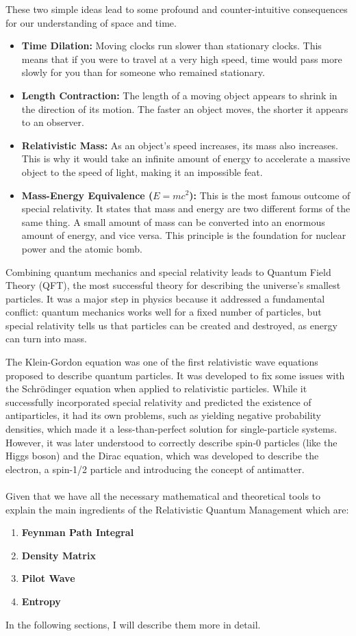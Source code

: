 \documentclass{article}
\begin{document}
These two simple ideas lead to some profound and counter-intuitive consequences for our understanding of space and time.

\begin{itemize}
    \item \textbf{Time Dilation:} Moving clocks run slower than stationary clocks. This means that if you were to travel at a very high speed, time would pass more slowly for you than for someone who remained stationary.
    \item \textbf{Length Contraction:} The length of a moving object appears to shrink in the direction of its motion. The faster an object moves, the shorter it appears to an observer.
    \item \textbf{Relativistic Mass:} As an object's speed increases, its mass also increases. This is why it would take an infinite amount of energy to accelerate a massive object to the speed of light, making it an impossible feat.
    \item \textbf{Mass-Energy Equivalence ($E=mc^2$):} This is the most famous outcome of special relativity. It states that mass and energy are two different forms of the same thing. A small amount of mass can be converted into an enormous amount of energy, and vice versa. This principle is the foundation for nuclear power and the atomic bomb.
\end{itemize}
Combining quantum mechanics and special relativity leads to Quantum Field Theory (QFT), the most successful theory for describing the universe's smallest particles. It was a major step in physics because it addressed a fundamental conflict: quantum mechanics works well for a fixed number of particles, but special relativity tells us that particles can be created and destroyed, as energy can turn into mass.

The Klein-Gordon equation was one of the first relativistic wave equations proposed to describe quantum particles. It was developed to fix some issues with the Schrödinger equation when applied to relativistic particles. While it successfully incorporated special relativity and predicted the existence of antiparticles, it had its own problems, such as yielding negative probability densities, which made it a less-than-perfect solution for single-particle systems. However, it was later understood to correctly describe spin-0 particles (like the Higgs boson) and the Dirac equation, which was developed to describe the electron, a spin-1/2 particle and introducing the concept of antimatter.\\\\
Given that we have all the necessary mathematical and theoretical tools to explain the main ingredients of the Relativistic Quantum Management which are: 
\begin{enumerate}
  \item \textbf{Feynman Path Integral}
  \item \textbf{Density Matrix}
  \item \textbf{Pilot Wave}
  \item \textbf{Entropy}
\end{enumerate}
In the following sections, I will describe them more in detail.
\newpage
\end{document}
